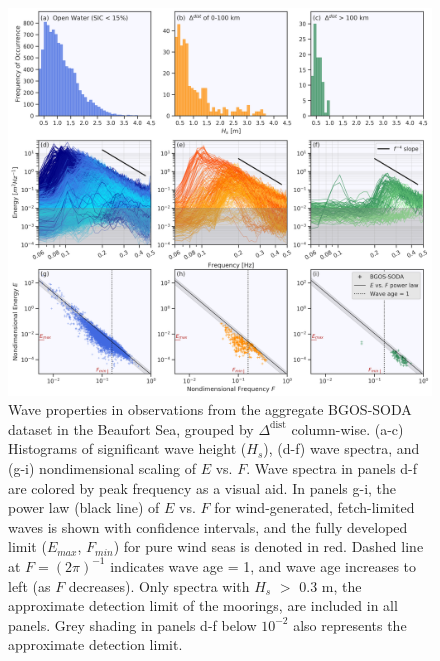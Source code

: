 \documentclass [11pt, proquest] {uwthesis}[2020/02/24]
\begin{document}
        
\begin{figure}
    \noindent\includegraphics[width=\textwidth]{obspanel_04.png}
    \caption{
    Wave properties in observations from the aggregate BGOS-SODA dataset in the Beaufort Sea, grouped by  $\Delta^{ \mathrm{dist}}$ column-wise. (a-c) Histograms of significant wave height ($H_s$), (d-f) wave spectra, and (g-i) nondimensional scaling of $E$ vs. $F$. Wave spectra in panels d-f are colored by peak frequency as a visual aid. In panels g-i, the power law (black line) of $E$ vs. $F$ for wind-generated, fetch-limited waves is shown with confidence intervals, and the fully developed limit ($E_{max}$, $F_{min}$) for pure wind seas \cite{Young1999} is denoted in red. Dashed line at $F=\left(2\pi\right)^{-1}$ indicates wave age = 1, and wave age increases to left (as $F$ decreases). Only spectra with \(H_s\) $>$ 0.3 m, the approximate detection limit of the moorings, are included in all panels. Grey shading in panels d-f below $10^{-2}$ also represents the approximate detection limit.}
    \label{fig:obspanel}
\end{figure}

\end{document}
